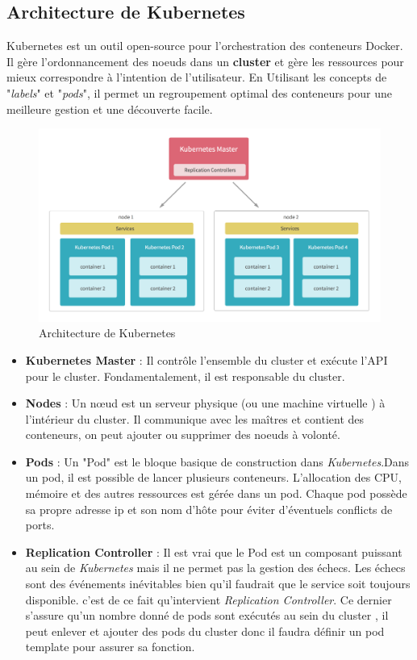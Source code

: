 \begin{onehalfspace}
\subsection{Architecture de Kubernetes}
Kubernetes est un outil open-source pour l'orchestration des conteneurs Docker. Il gère l'ordonnancement des noeuds dans un \textbf{cluster} et gère les ressources pour mieux correspondre à l'intention de l'utilisateur. En Utilisant les concepts de "\emph{labels}" et "\emph{pods}", il permet un regroupement optimal des conteneurs pour une meilleure gestion et une découverte facile.
\begin{figure}[H]
\centering
\includegraphics [scale=0.4]{chapitre3/assets/archkuber.png}
\caption{Architecture de Kubernetes}
\end{figure}

\begin{itemize}
\item \textbf{Kubernetes Master} : Il contrôle l'ensemble du cluster et exécute l'API pour le cluster. Fondamentalement, il est responsable du cluster.

\item \textbf{Nodes} : Un nœud est un serveur physique (ou une machine virtuelle ) à l'intérieur du cluster. Il communique avec les maîtres et contient des conteneurs, on peut ajouter ou supprimer des noeuds à volonté.

\item \textbf{Pods} : Un "Pod" est le bloque basique de construction dans \emph{Kubernetes}.Dans un pod, il est possible de lancer plusieurs conteneurs. L'allocation des CPU, mémoire et des autres ressources est gérée dans un pod. Chaque pod possède sa propre adresse ip et son nom d'hôte pour éviter d'éventuels conflicts de ports.

\item \textbf{Replication Controller} : Il est vrai que le Pod est un composant puissant au sein de \emph{Kubernetes} mais il ne permet pas la gestion des échecs. Les échecs sont des événements inévitables bien qu'il faudrait que le service soit toujours disponible. c'est de ce fait qu'intervient \emph{Replication Controller}. Ce dernier s'assure qu'un nombre donné de pods sont exécutés au sein du cluster , il peut enlever et ajouter des pods du cluster donc il faudra définir un pod template pour assurer sa fonction.


\end{itemize}
\end{onehalfspace}
